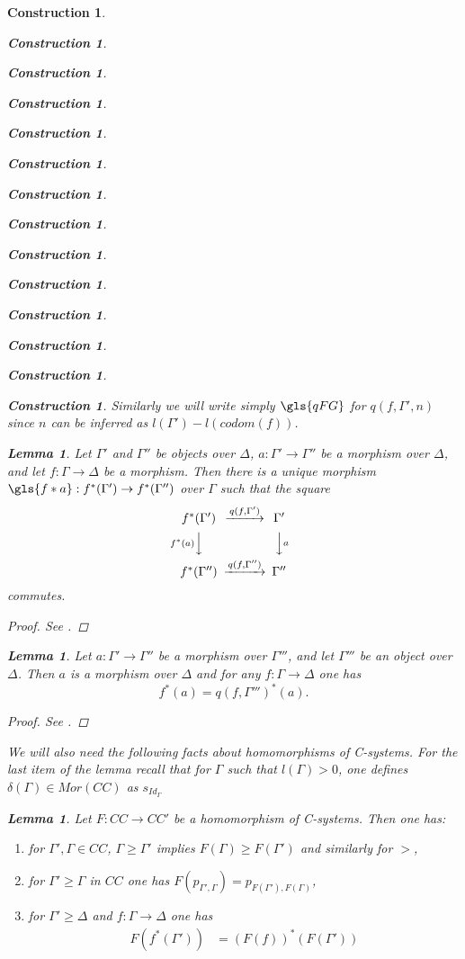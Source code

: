 \documentclass[onecolumn,12pt]{amsart}
\newtheorem{lemma}[proposition]{Lemma}
\numberwithin{proposition}{subsection}
\newtheorem{construction}[proposition]{Construction}
\newcommand{\sr}{\rightarrow}
\begin{document}
\begin{construction}
\begin{construction}
\begin{construction}
\begin{construction}
\begin{construction}
\begin{construction}
\begin{construction}
\begin{construction}
\begin{construction}
\begin{construction}
\begin{construction}
\begin{construction}
\begin{construction}
\begin{construction}
Similarly we will write simply $\gls{qFG}$ for $q(f,\Gamma',n)$ since $n$ can be inferred as $l(\Gamma')-l(codom(f))$. 
%
\begin{lemma}
\label{2015.08.23.l1a} 
Let $\Gamma'$ and $\Gamma''$ be objects over $\Delta$,
$a:\Gamma'\sr \Gamma''$ be a morphism over $\Delta$, and let $f:\Gamma\sr\Delta$ be a
morphism. Then there is a unique morphism $\gls{f*a}:f^*(\Gamma')\sr
f^*(\Gamma'')$ over $\Gamma$ such that the square
%
$$
\begin{CD}
f^*(\Gamma') @>q(f,\Gamma')>> \Gamma'\\
@Vf^*(a)VV @VVaV\\
f^*(\Gamma'') @>q(f,\Gamma'')>> \Gamma''
\end{CD}
$$
%
commutes.
\end{lemma}
%
\begin{proof}
See \cite[Lemma 2.13]{fromunivwithPiI}.
\end{proof}
%
\begin{lemma}
\label{2015.08.29.l2} 
Let $a:\Gamma'\sr\Gamma''$ be a morphism over
$\Gamma'''$, and let $\Gamma'''$ be an object over $\Delta$. Then $a$ is a morphism
over $\Delta$ and for any $f:\Gamma\sr \Delta$ one has
%
\begin{equation}\label{2015.08.29.eq2}
f^*(a)=q(f,\Gamma''')^*(a).
\end{equation}%
%
\end{lemma}
%
\begin{proof}
See \cite[Lemma 2.15]{fromunivwithPiI}.
\end{proof}
%
We will also need the following facts about homomorphisms of C-systems. For the
last item of the lemma recall that for $\Gamma$ such that $l(\Gamma)>0$, one
defines $\delta(\Gamma)\in Mor(CC)$ as $s_{Id_{\Gamma}}$
%
\begin{lemma}
\label{2015.09.03.l2}
Let $F:CC\sr CC'$ be a homomorphism of C-systems. Then one has:
%
\begin{enumerate}
\item for $\Gamma',\Gamma\in CC$, $\Gamma\ge \Gamma'$ implies $F(\Gamma)\ge F(\Gamma')$ and similarly for $>$,
\item for $\Gamma'\ge \Gamma$ in $CC$ one has $F(p_{\Gamma',\Gamma})=p_{F(\Gamma'),F(\Gamma)}$,
\item for $\Gamma'\ge \Delta$ and $f:\Gamma\sr \Delta$ one has
  \begin{equation*}
    \begin{split}
      F(f^*(\Gamma'))&=(F(f))^*(F(\Gamma')) \\

\end{split}
\end{equation*}
\end{enumerate}
\end{lemma}
\end{construction}
\end{construction}
\end{construction}
\end{construction}
\end{construction}
\end{construction}
\end{construction}
\end{construction}
\end{construction}
\end{construction}
\end{construction}
\end{construction}
\end{construction}
\end{construction}
\end{document}
